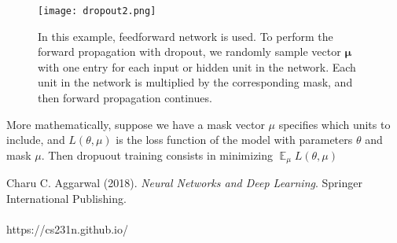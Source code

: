 \documentclass[11pt]{article}
\DeclareMathOperator{\EX}{\mathbb{E}}
\begin{document}
\begin{figure}[H]
\centering
\texttt{[image: dropout2.png]}
\caption{In this example, feedforward network is used. To perform the forward propagation with dropout, we randomly sample vector $\mathbf{\mu}$ with one entry for each input or hidden unit in the network. Each unit in the network is multiplied by the corresponding mask, and then forward propagation continues.}
\label{fig:figure3}
\end{figure}
More mathematically, suppose we have a mask vector $\mu$ specifies which units to include, and $L(\theta,\mu)$ is the loss function of the model with parameters $\theta$ and mask $\mu$. Then dropuout training consists in minimizing $\EX_\mu L(\theta,\mu)$ \cite{GoodBengCour16}

Charu C. Aggarwal (2018). \textit{Neural Networks and Deep Learning}. Springer International Publishing.\\\\
https://cs231n.github.io/
\end{document}
